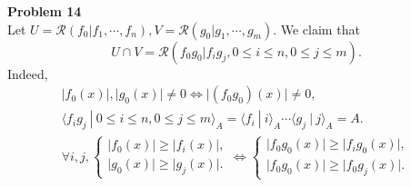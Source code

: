 \documentclass[10pt]{article}
\newcommand{\sep}[0]{\:|\:}
\newcommand{\ab}[1]{\vert #1 \vert}
\begin{document}
\par\textbf{Problem 14}\\
Let $U=\mathcal{R}(f_0|f_1,\cdots,f_n),V=\mathcal{R}(g_0|g_1,\cdots,g_m)$. We claim that 
\begin{equation*}
    U\cap V = \mathcal{R}(f_0g_0|f_ig_j,0\leq i\leq n,0\leq j \leq m).
\end{equation*}
Indeed,
\begin{align*}
    \ab{f_0(x)},\ab{g_0(x)}\not=0\iff \ab{(f_0g_0)(x)} \not=0,\\
    \langle f_ig_j\sep 0\leq i\leq n,0\leq j\leq m\rangle_A = \langle f_i\sep i\rangle_A\cdots\langle g_j\sep j\rangle_A = A.\\
    \forall i,j, \begin{cases}
        \ab{f_0(x)}\geq\ab{f_i(x)},\\
        \ab{g_0(x)}\geq \ab{g_j(x)}.
    \end{cases}
    \iff \begin{cases}
        \ab{f_0g_0(x)}\geq\ab{f_ig_0(x)},\\
        \ab{f_0g_0(x)}\geq \ab{f_0g_j(x)}.
    \end{cases}
\end{align*}
\end{document}
